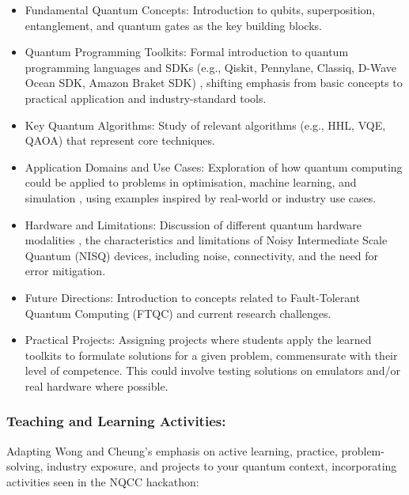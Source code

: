 \documentclass[11pt,a4paper]{article}
\begin{document}
\begin{itemize}	

\item Fundamental Quantum Concepts: Introduction to qubits, superposition, entanglement, and quantum gates as the key building blocks.

\item Quantum Programming Toolkits: Formal introduction to quantum programming languages and SDKs (e.g., Qiskit, Pennylane, Classiq, D-Wave Ocean SDK, Amazon Braket SDK)
, shifting emphasis from basic concepts to practical application and industry-standard tools.

\item Key Quantum Algorithms: Study of relevant algorithms (e.g., HHL, VQE, QAOA)
that represent core techniques.

\item Application Domains and Use Cases: Exploration of how quantum computing could be applied to problems in optimisation, machine learning, and simulation
, using examples inspired by real-world or industry use cases.

\item Hardware and Limitations: Discussion of different quantum hardware modalities
, the characteristics and limitations of Noisy Intermediate Scale Quantum (NISQ) devices, including noise, connectivity, and the need for error mitigation.

\item Future Directions: Introduction to concepts related to Fault-Tolerant Quantum Computing (FTQC) and current research challenges.

\item Practical Projects: Assigning projects where students apply the learned toolkits to formulate solutions for a given problem, commensurate with their level of competence. This could involve testing solutions on emulators and/or real hardware where possible.

\end{itemize}	

\subsubsection{Teaching and Learning Activities:} 

Adapting Wong and Cheung's emphasis on active learning, practice, problem-solving, industry exposure, and projects
to your quantum context, incorporating activities seen in the NQCC hackathon:
\end{document}

